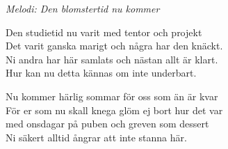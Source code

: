{\footnotesize\textit{Melodi: Den blomstertid nu kommer}}\par
\vspace{10pt}
Den studietid nu varit med tentor och projekt\\
Det varit ganska marigt och några har den knäckt.\\
Ni andra har här samlats och nästan allt är klart.\\
Hur kan nu detta kännas om inte underbart.\par
\vspace{10pt}
Nu kommer härlig sommar för oss som än är kvar\\
För er som nu skall knega glöm ej bort hur det var\\
med onsdagar på puben och greven som dessert\\
Ni säkert alltid ångrar att inte stanna här.
